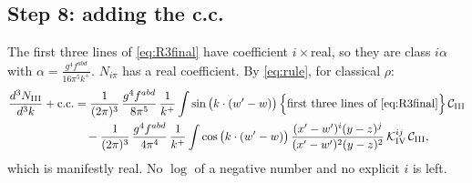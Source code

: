 \documentclass[10pt]{article}
\numberwithin{equation}{section}
\begin{document}
\subsection{Step 8: adding the c.c.}
The first three lines of \eqref{eq:R3final} have coefficient $i\times$real, so they are class $i\alpha$ with $\alpha=\frac{g^{4}f^{abd}}{16\pi^{5}k^{+}}$. $N_{i\pi}$ has a real coefficient. By \eqref{eq:rule}, for classical $\rho$:
\begin{align}
\frac{d^{3}N_{\rm III}}{d^{3}k}+{\rm c.c.}&=\frac{1}{(2\pi)^{3}}\,\frac{g^{4}f^{abd}}{8\pi^{5}}\,\frac{1}{k^{+}}\int\sin\big(k\cdot(w'-w)\big)\,\Big\{\text{first three lines of \eqref{eq:R3final}}\Big\}\,\mathcal C_{\rm III}\notag\\
&\quad-\frac{1}{(2\pi)^{3}}\,\frac{g^{4}f^{abd}}{4\pi^{4}}\,\frac{1}{k^{+}}\int\cos\big(k\cdot(w'-w)\big)\,\frac{(x'-w')^{i}(y-z)^{j}}{(x'-w')^{2}(y-z)^{2}}\,\mathcal K^{ij}_{\rm IV}\,\mathcal C_{\rm III},
\end{align}
which is manifestly real. No $\log$ of a negative number and no explicit $i$ is left.
\end{document}
